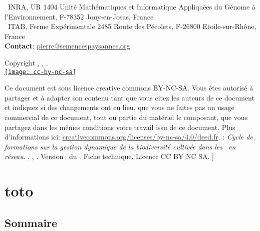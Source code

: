 \noindent{}~INRA, UR 1404 Unité Mathématiques et Informatique Appliquées du Génome à l'Environnement, F-78352 Jouy-en-Josas, France \\
\noindent{}~ITAB, Ferme Expérimentale 2485 Route des Pécolets, F-26800 Etoile-sur-Rhône, France \\
\noindent\up{*} \textbf{Contact}: \href{mailto:pierre@semencespaysannes.org}{\textcolor{mln-green} {pierre@semencespaysannes.org}}
\normalsize
\vfill
\begin{center}
Copyright \RSP, \INRA, \ITAB.
~\\
\href{http://creativecommons.org/licenses/by-nc-sa/4.0/deed.fr}{\texttt{[image: cc-by-nc-sa]}}
\end{center}
\small
Ce document est sous licence creative commons BY-NC-SA.
Vous êtes autorisé à partager et à adapter son contenu tant 
que vous citez les auteurs de ce document et indiquez si des changements ont eu lieu, 
que vous ne faites pas un usage commercial de ce document, tout ou partie du matériel le composant,
que vous partagez dans les mêmes conditions votre travail issu de ce document. 
Plus d'informations ici: \url{creativecommons.org/licenses/by-nc-sa/4.0/deed.fr}.
\vfill
{}:
\textit{
Cycle de formations sur la gestion dynamique de la biodiversité cultivée dans les
\MSPs~en réseau}.
\RSP, \INRA, \ITAB.
Version \versionCF~du \dateversionCF.
Fiche technique.
Licence CC BY NC SA.
]


\part{toto}

\pagestyle{empty} %
\chapter*{Sommaire}
\cleardoublepage %
\pagestyle{fancy} %

\hypersetup{colorlinks=true}

